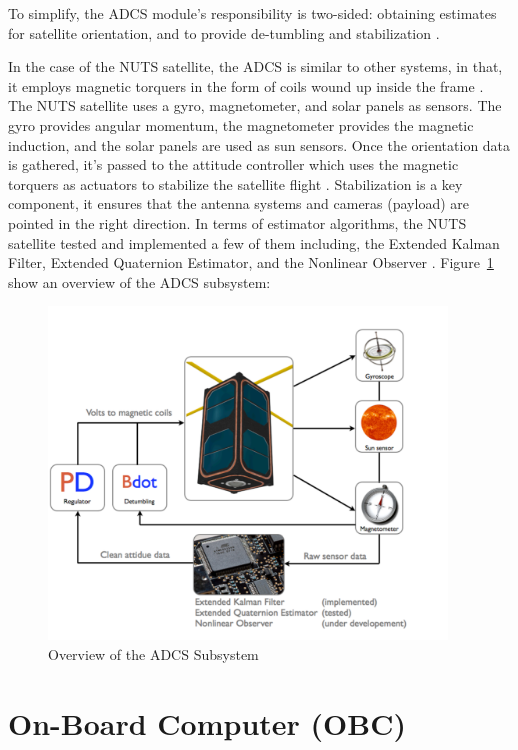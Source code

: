 \documentclass[12pt, a4paper]{report}
\begin{document}
To simplify, the ADCS module's responsibility is two-sided: obtaining estimates for satellite orientation, and to provide de-tumbling and stabilization \cite{power_distribution}. 

In the case of the NUTS satellite, the ADCS is similar to other systems, in that, it employs magnetic torquers in the form of coils wound up inside the frame \cite{overview}. The NUTS satellite uses a gyro, magnetometer, and solar panels as sensors. The gyro provides angular momentum, the magnetometer provides the magnetic induction, and the solar panels are used as sun sensors. Once the orientation data is gathered, it's passed to the attitude controller which uses the magnetic torquers as actuators to stabilize the satellite flight \cite{power_distribution}. Stabilization is a key component, it ensures that the antenna systems and cameras (payload) are pointed in the right direction. In terms of estimator algorithms, the NUTS satellite tested and implemented a few of them including, the Extended Kalman Filter, Extended Quaternion Estimator, and the Nonlinear Observer \cite{overview}. Figure~\ref{fig:adcs} show an overview of the ADCS subsystem:

\begin{figure}[H]
    \centering
    \includegraphics[width=300pt]{images/nuts_adcs.PNG}
    \caption{Overview of the ADCS Subsystem}
    \label{fig:adcs}
\end{figure}

\section{On-Board Computer (OBC)}
\end{document}

